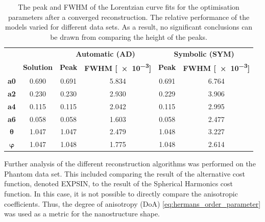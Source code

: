 \begin{table}[h!]
    \centering
    \caption[Peak and FWHM of Lorentzian Curve Fit]{  The peak and FWHM of the Lorentzian curve fits
        for the optimisation parameters after a converged reconstruction.
        The relative performance of the models varied for different data sets.
        As a result, no significant conclusions can be drawn from comparing the height of the peaks.
    }
    \label{tab:curve_fitting}
    \begin{tabular}{ c c c c c c }
        \hline %
        \textbf{}      &                   & \multicolumn{2}{c}{\textbf{Automatic (AD)}} & \multicolumn{2}{c}{\textbf{Symbolic (SYM)}}                                             \\
        \textbf{}      & \textbf{Solution} & \textbf{Peak}                               & \textbf{FWHM [\num{e-3}]}                   & \textbf{Peak} & \textbf{FWHM [\num{e-3}]} \\
        \hline %
        \textbf{a0}    & 0.690             & 0.691                                       & 5.834                                       & 0.691         & 6.764                     \\
        \textbf{a2}    & 0.230             & 0.230                                       & 2.930                                       & 0.229         & 3.906                     \\
        \textbf{a4}    & 0.115             & 0.115                                       & 2.042                                       & 0.115         & 2.995                     \\
        \textbf{a6}    & 0.058             & 0.058                                       & 1.603                                       & 0.058         & 2.477                     \\
        $\bm{\theta}$  & 1.047             & 1.047                                       & 2.479                                       & 1.048         & 3.227                     \\
        $\bm{\varphi}$ & 1.047             & 1.048                                       & 1.775                                       & 1.048         & 2.614                     \\
        \hline %
    \end{tabular}
\end{table}

\clearpage

Further analysis of the different reconstruction algorithms was performed on the Phantom data set.
This included comparing the result of the alternative cost function, denoted EXPSIN, to the result of the Spherical Harmonics cost function.
In this case, it is not possible to directly compare the anisotropic coefficients. Thus, the degree of anisotropy (DoA) \eqref{eq:hermans_order_parameter} was used as a metric for the nanostructure shape.

